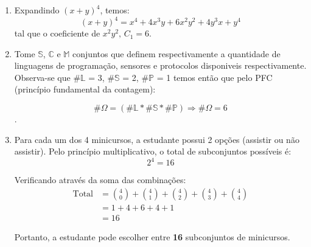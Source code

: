 \documentclass[10pt, a4paper]{article}
\begin{document}
\begin{enumerate}
    \item Expandindo $(x + y)^{4}$, temos: 
    $$(x + y)^{4} = x^{4} + 4x^{3}y + 6x^{2}y^{2} + 4y^{3}x + y^{4}$$ 
    tal que o coeficiente de $x^{2}y^{2} \text{, } C_1 = 6$.

    \item Tome $\mathbb{S}$, $\mathbb{C}$ e $\mathbb{M}$ conjuntos que definem respectivamente a quantidade de linguagens de programação, sensores e protocolos
    disponiveis respectivamente. Observa-se que \#$\mathbb{L}$ = 3, \#$\mathbb{S}$ = 2, \#$\mathbb{P}$ = 1 temos então que pelo PFC (princípio fundamental da contagem): 
    
    $$\#\Omega = (\#\mathbb{L} * \#\mathbb{S} * \#\mathbb{P}) \Longrightarrow  \#\Omega = 6$$. 

    \item Para cada um dos 4 minicursos, a estudante possui 2 opções (assistir ou não assistir). Pelo princípio multiplicativo, o total de subconjuntos possíveis é:
    $$ 2^4 = 16 $$

    \noindent Verificando através da soma das combinações:
    $$
    \begin{aligned}
    \text{Total} &= \binom{4}{0} + \binom{4}{1} + \binom{4}{2} + \binom{4}{3} + \binom{4}{4} \\
    &= 1 + 4 + 6 + 4 + 1 \\
    &= 16
    \end{aligned}
    $$

    \noindent Portanto, a estudante pode escolher entre \textbf{16} subconjuntos de minicursos. 

\end{enumerate} 
\end{document}

